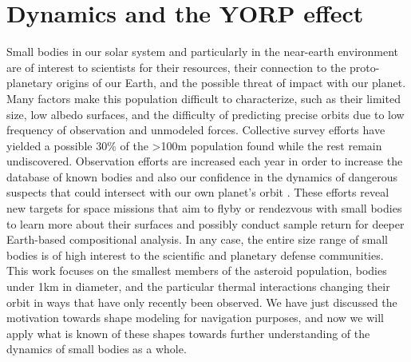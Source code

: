 \section{Dynamics and the YORP effect}
Small bodies in our solar system and particularly in the near-earth environment are of interest to scientists for their resources, their connection to the proto-planetary origins of our Earth, and the possible threat of impact with our planet. Many factors make this population difficult to characterize, such as their limited size, low albedo surfaces, and the difficulty of predicting precise orbits due to low frequency of observation and unmodeled forces. Collective survey efforts have yielded a possible $30\%$ of the >100m population found while the rest remain undiscovered. Observation efforts are increased each year in order to increase the database of known bodies and also our confidence in the dynamics of dangerous suspects that could intersect with our own planet's orbit \cite{Jones2016}\cite{Mainzer2011}. These efforts reveal new targets for space missions that aim to flyby or rendezvous with small bodies to learn more about their surfaces and possibly conduct sample return for deeper Earth-based compositional analysis. In any case, the entire size range of small bodies is of high interest to the scientific and planetary defense communities. This work focuses on the smallest members of the asteroid population, bodies under 1km in diameter, and the particular thermal interactions changing their orbit in ways that have only recently been observed. We have just discussed the motivation towards shape modeling for navigation purposes, and now we will apply what is known of these shapes towards further understanding of the dynamics of small bodies as a whole. 

